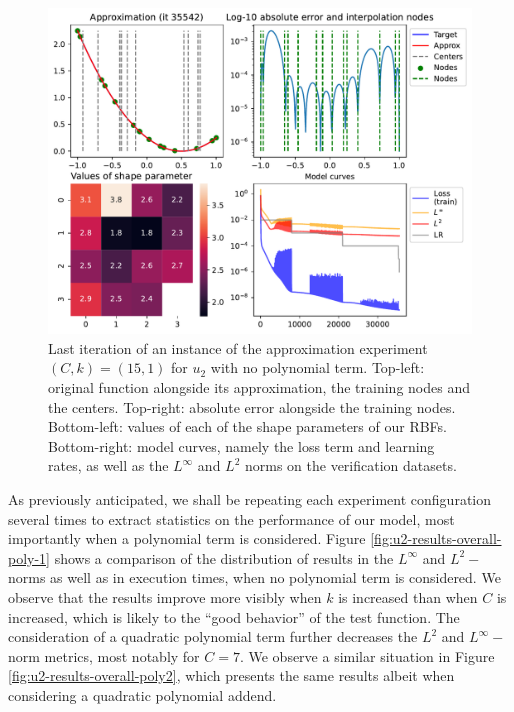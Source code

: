 \documentclass[12pt]{report} %
\begin{document}
\begin{figure}
  \includegraphics[width=\textwidth]{imagenes/experiments/1d/statistical_1d_full_scheduler_interpolation/u2-TR15-C15-Kgaussian_kernel-Sh2.5-6-E35542.pdf}
  \caption{Last iteration of an instance of the approximation experiment $(C,k)=(15,1)$ for $u_2$ with no polynomial term. Top-left: original function alongside its approximation, the training nodes and the centers. Top-right: absolute error alongside the training nodes. Bottom-left: values of each of the shape parameters of our RBFs. Bottom-right: model curves, namely the loss term and learning rates, as well as the $L^\infty$ and $L^2$ norms on the verification datasets.}
  \label{u2-example-training-TR15-C15}
\end{figure}

As previously anticipated, we shall be repeating each experiment configuration several times to extract statistics on the performance of our model, most importantly when a polynomial term is considered. Figure \ref{fig:u2-results-overall-poly-1} shows a comparison of the distribution of results in the $L^\infty$ and $L^2-$norms as well as in execution times, when no polynomial term is considered. We observe that the results improve more visibly when $k$ is increased than when $C$ is increased, which is likely to the ``good behavior'' of the test function. The consideration of a quadratic polynomial term further decreases the $L^2$ and $L^\infty-$norm metrics, most notably for $C=7$. We observe a similar situation in Figure \ref{fig:u2-results-overall-poly2}, which presents the same results albeit when considering a quadratic polynomial addend.
\end{document}
